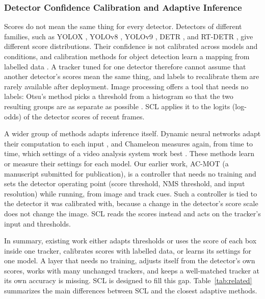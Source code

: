 \documentclass[pdflatex,sn-mathphys-num,iicol]{sn-jnl}
\newcommand{\scl}{SCL}
\begin{document}
\subsubsection{Detector Confidence Calibration and Adaptive Inference}
Scores do not mean the same thing for every detector. Detectors of different families, such as
YOLOX \cite{ge2021yolox}, YOLOv8 \cite{jocher2023yolov8}, YOLOv9 \cite{wang2024yolov9}, DETR
\cite{carion2020detr}, and RT-DETR \cite{zhao2024rtdetr}, give different score distributions. Their
confidence is not calibrated across models and conditions, and calibration methods for object
detection learn a mapping from labelled data \cite{kuppers2020detcalib}. A tracker tuned for one
detector therefore cannot assume that another detector's scores mean the same thing, and labels to
recalibrate them are rarely available after deployment. Image processing offers a tool that needs
no labels: Otsu's method picks a threshold from a histogram so that the two resulting groups are as
separate as possible \cite{otsu1979}. \scl{} applies it to the logits (log-odds) of the detector
scores of recent frames.

A wider group of methods adapts inference itself. Dynamic neural networks adapt their computation
to each input \cite{han2022dynamic}, and Chameleon measures again, from time to time, which settings
of a video analysis system work best \cite{jiang2018chameleon}. These methods learn or measure their
settings for each model. Our earlier work, AC-MOT (a manuscript submitted for publication), is a
controller that needs no training and sets the detector operating point (score threshold, NMS
threshold, and input resolution) while running, from image and track cues. Such a controller is
tied to the detector it was calibrated with, because a change in the detector's score scale does
not change the image. \scl{} reads the scores instead and acts on the tracker's input and
thresholds.

In summary, existing work either adapts thresholds or uses the score of each box inside one
tracker, calibrates scores with labelled data, or learns its settings for one model. A layer that
needs no training, adjusts itself from the detector's own scores, works with many unchanged
trackers, and keeps a well-matched tracker at its own accuracy is missing. \scl{} is designed to
fill this gap. Table~\ref{tab:related} summarizes the main differences between \scl{} and the
closest adaptive methods.
\end{document}
